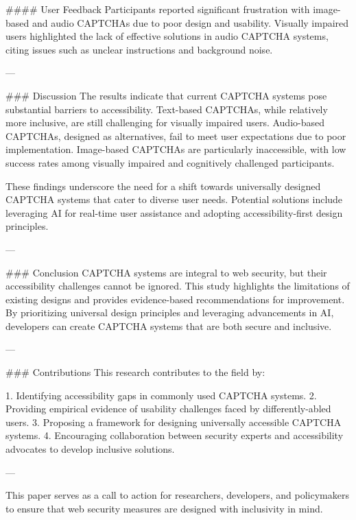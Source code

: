 #### User Feedback  
Participants reported significant frustration with image-based and audio CAPTCHAs due to poor design and usability. Visually impaired users highlighted the lack of effective solutions in audio CAPTCHA systems, citing issues such as unclear instructions and background noise.

---

### Discussion  
The results indicate that current CAPTCHA systems pose substantial barriers to accessibility. Text-based CAPTCHAs, while relatively more inclusive, are still challenging for visually impaired users. Audio-based CAPTCHAs, designed as alternatives, fail to meet user expectations due to poor implementation. Image-based CAPTCHAs are particularly inaccessible, with low success rates among visually impaired and cognitively challenged participants.

These findings underscore the need for a shift towards universally designed CAPTCHA systems that cater to diverse user needs. Potential solutions include leveraging AI for real-time user assistance and adopting accessibility-first design principles.

---

### Conclusion  
CAPTCHA systems are integral to web security, but their accessibility challenges cannot be ignored. This study highlights the limitations of existing designs and provides evidence-based recommendations for improvement. By prioritizing universal design principles and leveraging advancements in AI, developers can create CAPTCHA systems that are both secure and inclusive.

---

### Contributions  
This research contributes to the field by:

1. Identifying accessibility gaps in commonly used CAPTCHA systems.
2. Providing empirical evidence of usability challenges faced by differently-abled users.
3. Proposing a framework for designing universally accessible CAPTCHA systems.
4. Encouraging collaboration between security experts and accessibility advocates to develop inclusive solutions.

--- 

This paper serves as a call to action for researchers, developers, and policymakers to ensure that web security measures are designed with inclusivity in mind.